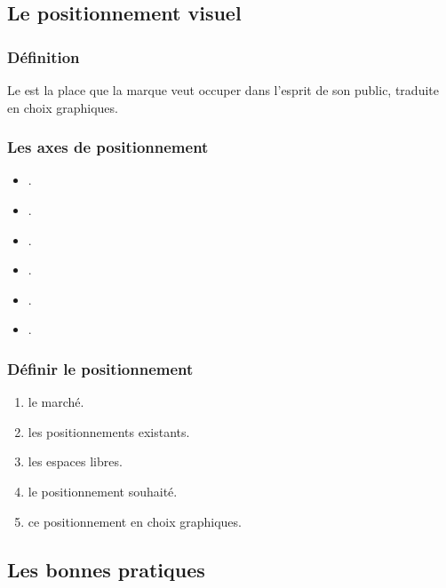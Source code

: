 \subsection{Le positionnement visuel}

\subsubsection{Définition}

Le  est la place que la marque veut occuper dans l'esprit de son public, traduite en choix graphiques.

\subsubsection{Les axes de positionnement}

\begin{itemize}
    \item {}.
    \item {}.
    \item {}.
    \item {}.
    \item {}.
    \item {}.
\end{itemize}

\subsubsection{Définir le positionnement}

\begin{enumerate}
    \item {} le marché.
    \item {} les positionnements existants.
    \item {} les espaces libres.
    \item {} le positionnement souhaité.
    \item {} ce positionnement en choix graphiques.
\end{enumerate}

\subsection{Les bonnes pratiques}

